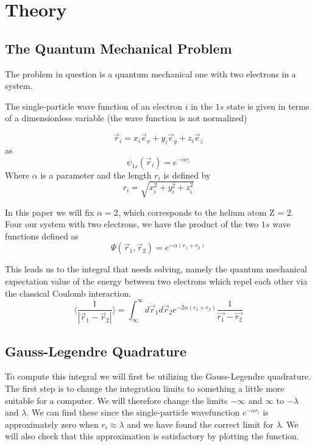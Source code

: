 \documentclass[../main.tex]{subfiles}
\begin{document}
\section{Theory} \label{sec:theory}
\subsection{The Quantum Mechanical Problem} \label{sec:QMProb}
The problem in question is a quantum mechanical one with two electrons in a system.

The single-particle wave function of an electron $i$ in the $1s$ state is given in terms of a dimensionless variable (the wave function is not normalized)

\[\vec{r}_i = x_i \vec{e}_x + y_i \vec{e}_y + z_i \vec{e}_z\]
as
\[\psi_{1s}(\vec{r}_i) = e^{-\alpha r_i}\]
Where $\alpha$ is a parameter and the length $r_i$ is defined by
\[r_i = \sqrt{x_i^2 + y_i^2 + z_i^2}\]

In this paper we will fix $\alpha = 2$, which corresponds to the helium atom Z = 2.\\

Four our system with two electrons, we have the product of the two $1s$ wave functions defined as
\[\Psi(\vec{r}_1, \vec{r}_2) = e^{-\alpha(r_1 + r_2)}\]

This leads us to the integral that needs solving, namely the quantum mechanical expectation value of the energy between two electrons which repel each other via the classical Coulomb interaction.
\[\langle \frac{1}{|\vec{r}_1 - \vec{r}_2|} \rangle = \int_{\infty}^\infty d\vec{r}_1 d\vec{r}_2 e^{-2\alpha(r_1 + r_2)} \frac{1}{\vec{r_1} - \vec{r_2}}\]



\subsection{Gauss-Legendre Quadrature} \label{sec:GLQ}
To compute this integral we will first be utilizing the Gauss-Legendre quadrature. The first step is to change the integration limits to something a little more suitable for a computer. We will therefore change the limits $-\infty$ and $\infty$ to $-\lambda$ and $\lambda$. We can find these since the single-particle wavefunction $e^{-\alpha r_i}$ is approximately zero when $r_i \approx \lambda$ and we have found the correct limit for $\lambda$. We will also check that this approximation is satisfactory by plotting the function.
\end{document}
